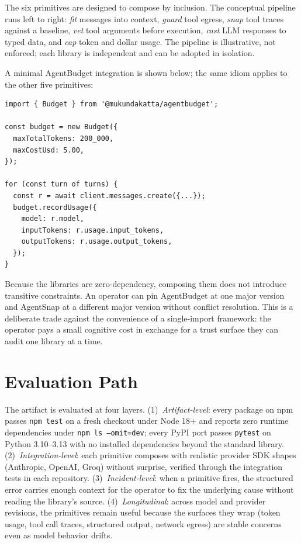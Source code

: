\documentclass[sigconf,review]{acmart}
\begin{document}
The six primitives are designed to compose by inclusion. The conceptual pipeline runs left to right: \emph{fit} messages into context, \emph{guard} tool egress, \emph{snap} tool traces against a baseline, \emph{vet} tool arguments before execution, \emph{cast} LLM responses to typed data, and \emph{cap} token and dollar usage. The pipeline is illustrative, not enforced; each library is independent and can be adopted in isolation.

A minimal AgentBudget integration is shown below; the same idiom applies to the other five primitives:

\begin{lstlisting}[language=JavaScriptLite,basicstyle=\ttfamily\small,frame=single,framesep=4pt,xleftmargin=0pt]
import { Budget } from '@mukundakatta/agentbudget';

const budget = new Budget({
  maxTotalTokens: 200_000,
  maxCostUsd: 5.00,
});

for (const turn of turns) {
  const r = await client.messages.create({...});
  budget.recordUsage({
    model: r.model,
    inputTokens: r.usage.input_tokens,
    outputTokens: r.usage.output_tokens,
  });
}
\end{lstlisting}

Because the libraries are zero-dependency, composing them does not introduce transitive constraints. An operator can pin AgentBudget at one major version and AgentSnap at a different major version without conflict resolution. This is a deliberate trade against the convenience of a single-import framework: the operator pays a small cognitive cost in exchange for a trust surface they can audit one library at a time.

\section{Evaluation Path}

The artifact is evaluated at four layers. (1)~\emph{Artifact-level}: every package on npm passes \texttt{npm test} on a fresh checkout under Node 18+ and reports zero runtime dependencies under \texttt{npm ls --omit=dev}; every PyPI port passes \texttt{pytest} on Python 3.10--3.13 with no installed dependencies beyond the standard library. (2)~\emph{Integration-level}: each primitive composes with realistic provider SDK shapes (Anthropic, OpenAI, Groq) without surprise, verified through the integration tests in each repository. (3)~\emph{Incident-level}: when a primitive fires, the structured error carries enough context for the operator to fix the underlying cause without reading the library's source. (4)~\emph{Longitudinal}: across model and provider revisions, the primitives remain useful because the surfaces they wrap (token usage, tool call traces, structured output, network egress) are stable concerns even as model behavior drifts.
\end{document}
